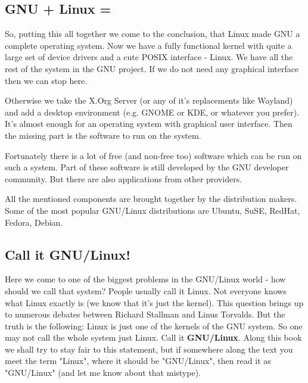 \subsection{GNU + Linux =}
So, putting this all together we come to the conclusion, that Linux made GNU a complete operating system. Now we have a fully functional kernel with quite a large set of device drivers and a cute POSIX interface - Linux. We have all the rest of the system in the GNU project. If we do not need any graphical interface then we can stop here.

Otherwise we take the X.Org Server (or any of it's replacements like Wayland) and add a desktop environment (e.g. GNOME or KDE, or whatever you prefer). It's almost enough for an operating system with graphical user interface. Then the missing part is the software to run on the system.

Fortunately there is a lot of free (and non-free too) software which can be run on such a system. Part of these software is still developed by the GNU developer community. But there are also applications from other providers.

All the mentioned components are brought together by the distribution makers. Some of the most popular GNU/Linux distributions are Ubuntu, SuSE, RedHat, Fedora, Debian. 


\subsection{Call it GNU/Linux!}
Here we come to one of the biggest problems in the GNU/Linux world - how should we call that system? People usually call it Linux. Not everyone knows what Linux exactly is (we know that it's just the kernel). This question brings up to numerous debates between Richard Stallman and Linus Torvalds. But the truth is the following: Linux is just one of the kernels of the GNU system. So one may not call the whole system just Linux. Call it \textbf {GNU/Linux}. Along this book we shall try to stay fair to this statement, but if somewhere along the text you meet the term "Linux", where it should be "GNU/Linux", then read it as "GNU/Linux" (and let me know about that mistype).
